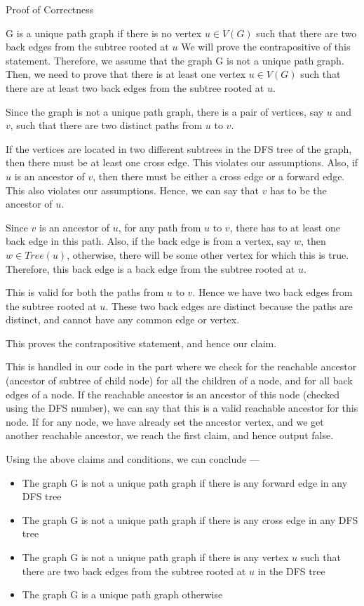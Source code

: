 \documentclass{article}
\begin{document}
\begin{question}
\begin{qsection}{Proof of Correctness}
\begin{qproof}{G is a unique path graph if there is no vertex $u \in V(G)$ such that there are two back edges from the subtree rooted at $u$}
			We will prove the contrapositive of this statement. Therefore, we assume that the graph G is not a unique path graph. Then, we need to prove that there is at least one vertex $u \in V(G)$ such that there are at least two back edges from the subtree rooted at $u$. \br\

			Since the graph is not a unique path graph, there is a pair of vertices, say $u$ and $v$, such that there are two distinct paths from $u$ to $v$. \br\

			If the vertices are located in two different subtrees in the DFS tree of the graph, then there must be at least one cross edge. This violates our assumptions. Also, if $u$ is an ancestor of $v$, then there must be either a cross edge or a forward edge. This also violates our assumptions. Hence, we can say that $v$ has to be the ancestor of $u$. \br\

			Since $v$ is an ancestor of $u$, for any path from $u$ to $v$, there has to at least one back edge in this path. Also, if the back edge is from a vertex, say $w$, then $w \in Tree(u)$, otherwise, there will be some other vertex for which this is true. Therefore, this back edge is a back edge from the subtree rooted at $u$. \br\

			This is valid for both the paths from $u$ to $v$. Hence we have two back edges from the subtree rooted at $u$. These two back edges are distinct because the paths are distinct, and cannot have any common edge or vertex. \br\

			This proves the contrapositive statement, and hence our claim.
			
		\end{qproof}

		This is handled in our code in the part where we check for the reachable ancestor (ancestor of subtree of child node) for all the children of a node, and for all back edges of a node. If the reachable ancestor is an ancestor of this node (checked using the DFS number), we can say that this is a valid reachable ancestor for this node. If for any node, we have already set the ancestor vertex, and we get another reachable ancestor, we reach the first claim, and hence output false. \br\

		Using the above claims and conditions, we can conclude ---

		\begin{itemize}
			\item The graph G is not a unique path graph if there is any forward edge in any DFS tree
			\item The graph G is not a unique path graph if there is any cross edge in any DFS tree
			\item The graph G is not a unique path graph if there is any vertex $u$ such that there are two back edges from the subtree rooted at $u$ in the DFS tree
			\item The graph G is a unique path graph otherwise
		\end{itemize}


\end{qsection}
\end{question}
\end{document}
